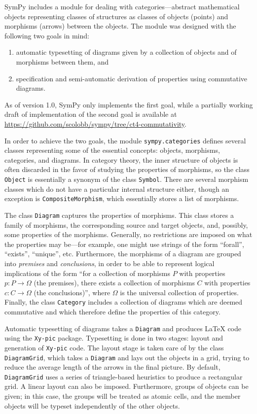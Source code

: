 SymPy includes a module for dealing with categories---abstract mathematical
objects representing classes of structures as classes of objects (points) and
morphisms (arrows) between the objects. The module was
designed with the following two goals in mind:

\begin{enumerate}
\item automatic typesetting of diagrams given by a collection of
  objects and of morphisms between them, and
\item specification and semi-automatic derivation of properties
  using commutative diagrams.
\end{enumerate}

As of version 1.0, SymPy only implements the first goal, while a partially
working draft of implementation of the second goal is available at
\url{https://github.com/scolobb/sympy/tree/ct4-commutativity}.

In order to achieve the two goals, the module \texttt{sympy.categories} defines
several classes representing some of the essential concepts: objects, morphisms,
categories, and diagrams.  In category theory, the inner structure of objects is
often discarded in the favor of studying the properties of morphisms, so the
class \texttt{Object} is essentially a synonym of the class \texttt{Symbol}.
There are several morphism classes which do not have a particular internal
structure either, though an exception is \texttt{CompositeMorphism}, which
essentially stores a list of morphisms.

The class \texttt{Diagram} captures the properties of morphisms. This class
stores a family of morphisms, the corresponding source and target objects,
and, possibly, some properties of the morphisms. Generally, no restrictions
are imposed on what the properties may be---for example, one might use strings
of the form ``forall'', ``exists'', ``unique'', etc. Furthermore, the
morphisms of a diagram are grouped into \textit{premises} and
\textit{conclusions}, in order to be able to represent logical implications of
the form ``for a collection of morphisms $P$ with properties $p:P\to \Omega$
(the premises), there exists a collection of morphisms $C$ with properties
$c:C\to \Omega$ (the conclusions)'', where $\Omega$ is the universal
collection of properties. Finally, the class \texttt{Category} includes a
collection of diagrams which are deemed commutative and which therefore define
the properties of this category.

Automatic typesetting of diagrams takes a \texttt{Diagram} and produces \LaTeX{}
code using the \texttt{Xy-pic} package.  Typesetting is done in two stages:
layout and generation of \texttt{Xy-pic} code.  The layout stage is taken care
of by the class \texttt{DiagramGrid}, which takes a \texttt{Diagram} and lays out
the objects in a grid, trying to reduce the average length of the arrows in the
final picture.  By default, \texttt{DiagramGrid} uses a series of triangle-based
heuristics to produce a rectangular grid.  A linear layout can also be imposed.
Furthermore, groups of objects can be given; in this case, the groups will be
treated as atomic cells, and the member objects will be typeset independently of
the other objects.

